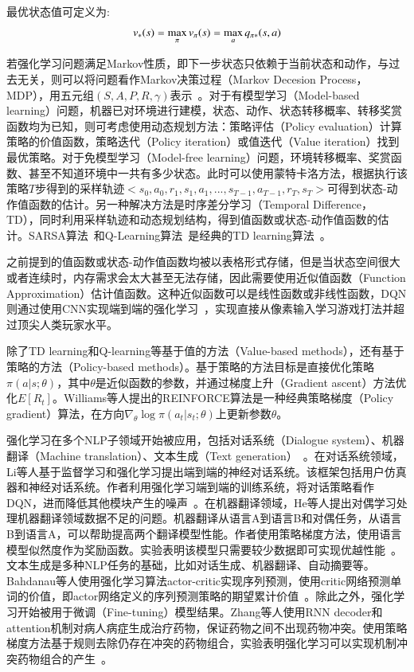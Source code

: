 最优状态值可定义为:
\begin{equation}
\label{equ:rl_optimal}
\setlength{\abovedisplayskip}{10pt}
\setlength{\belowdisplayskip}{10pt}
v_*(s)=\max_\pi v_\pi (s)=\max_a q_{\pi *}(s,a)
\end{equation}

若强化学习问题满足Markov性质，即下一步状态只依赖于当前状态和动作，与过去无关，则可以将问题看作Markov决策过程（Markov Decesion Process， MDP），用五元组$(S,A,P,R,\gamma)$表示~。对于有模型学习（Model-based learning）问题，机器已对环境进行建模，状态、动作、状态转移概率、转移奖赏函数均为已知，则可考虑使用动态规划方法：策略评估（Policy evaluation）计算策略的价值函数，策略迭代（Policy iteration）或值迭代（Value iteration）找到最优策略。对于免模型学习（Model-free learning）问题，环境转移概率、奖赏函数、甚至不知道环境中一共有多少状态。此时可以使用蒙特卡洛方法，根据执行该策略$T$步得到的采样轨迹$<s_0,a_0,r_1,s_1,a_1,...,s_{T-1},a_{T-1},r_T,s_T>$可得到状态-动作值函数的估计。另一种解决方法是时序差分学习（Temporal Difference， TD），同时利用采样轨迹和动态规划结构，得到值函数或状态-动作值函数的估计。SARSA算法~和Q-Learning算法~是经典的TD learning算法~。

之前提到的值函数或状态-动作值函数均被以表格形式存储，但是当状态空间很大或者连续时，内存需求会太大甚至无法存储，因此需要使用近似值函数（Function Approximation）估计值函数。这种近似函数可以是线性函数或非线性函数，DQN则通过使用CNN实现端到端的强化学习~\cite{mnih2013playing,mnih2015human}，实现直接从像素输入学习游戏打法并超过顶尖人类玩家水平。

除了TD learning和Q-learning等基于值的方法（Value-based methods），还有基于策略的方法（Policy-based methods）。基于策略的方法目标是直接优化策略$\pi(a|s;\theta)$，其中$\theta$是近似函数的参数，并通过梯度上升（Gradient ascent）方法优化$E[R_t]$。Williams等人提出的REINFORCE算法是一种经典策略梯度（Policy gradient）算法，在方向$\nabla_\theta \log \pi(a_t|s_t;\theta)$上更新参数$\theta$。

强化学习在多个NLP子领域开始被应用，包括对话系统（Dialogue system）、机器翻译（Machine translation）、文本生成（Text generation）~\cite{li2017deep,williams1992simple}。在对话系统领域，Li等人基于监督学习和强化学习提出端到端的神经对话系统。该框架包括用户仿真器和神经对话系统。作者利用强化学习端到端的训练系统，将对话策略看作DQN，进而降低其他模块产生的噪声~\cite{li2017end}。在机器翻译领域，He等人提出对偶学习处理机器翻译领域数据不足的问题。机器翻译从语言A到语言B和对偶任务，从语言B到语言A，可以帮助提高两个翻译模型性能。作者使用策略梯度方法，使用语言模型似然度作为奖励函数。实验表明该模型只需要较少数据即可实现优越性能~\cite{he2016dual}。文本生成是多种NLP任务的基础，比如对话生成、机器翻译、自动摘要等。Bahdanau等人使用强化学习算法actor-critic实现序列预测，使用critic网络预测单词的价值，即actor网络定义的序列预测策略的期望累计价值~\cite{bahdanau2016actor}。除此之外，强化学习开始被用于微调（Fine-tuning）模型结果。Zhang等人使用RNN decoder和attention机制对病人病症生成治疗药物，保证药物之间不出现药物冲突。使用策略梯度方法基于规则去除仍存在冲突的药物组合，实验表明强化学习可以实现机制冲突药物组合的产生~\cite{zhang2017leap}。


